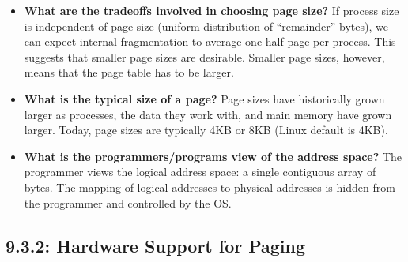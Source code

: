 \documentclass[12pt]{article}
\begin{document}
\begin{itemize}
    \item \textbf{What are the tradeoffs involved in choosing page size?} If process size is independent of page size (uniform distribution of ``remainder'' bytes), we can expect internal fragmentation to average one-half page per process. This suggests that smaller page sizes are desirable. Smaller page sizes, however, means that the page table has to be larger.
    \item \textbf{What is the typical size of a page?} Page sizes have historically grown larger as processes, the data they work with, and main memory have grown larger. Today, page sizes are typically 4KB or 8KB (Linux default is 4KB).
    \item \textbf{What is the programmers/programs view of the address space?} The programmer views the logical address space: a single contiguous array of bytes. The mapping of logical addresses to physical addresses is hidden from the programmer and controlled by the OS.
\end{itemize}

\subsection*{9.3.2: Hardware Support for Paging}
\end{document}
